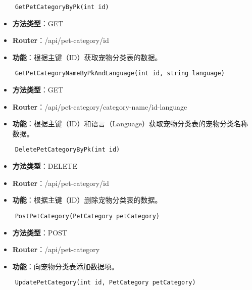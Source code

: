 \begin{verbatim}
	GetPetCategoryByPk(int id)
\end{verbatim}

\begin{itemize}
	\item \textbf{方法类型}：GET
	\item \textbf{Router}：/api/pet-category/{id}
	\item \textbf{功能}：根据主键（ID）获取宠物分类表的数据。
\end{itemize}

\begin{verbatim}
	GetPetCategoryNameByPkAndLanguage(int id, string language)
\end{verbatim}

\begin{itemize}
	\item \textbf{方法类型}：GET
	\item \textbf{Router}：/api/pet-category/category-name/{id}-{language}
	\item \textbf{功能}：根据主键（ID）和语言（Language）获取宠物分类表的宠物分类名称数据。
\end{itemize}

\begin{verbatim}
	DeletePetCategoryByPk(int id)
\end{verbatim}

\begin{itemize}
	\item \textbf{方法类型}：DELETE
	\item \textbf{Router}：/api/pet-category/{id}
	\item \textbf{功能}：根据主键（ID）删除宠物分类表的数据。
\end{itemize}

\begin{verbatim}
	PostPetCategory(PetCategory petCategory)
\end{verbatim}

\begin{itemize}
	\item \textbf{方法类型}：POST
	\item \textbf{Router}：/api/pet-category
	\item \textbf{功能}：向宠物分类表添加数据项。
\end{itemize}

\begin{verbatim}
	UpdatePetCategory(int id, PetCategory petCategory)
\end{verbatim}

